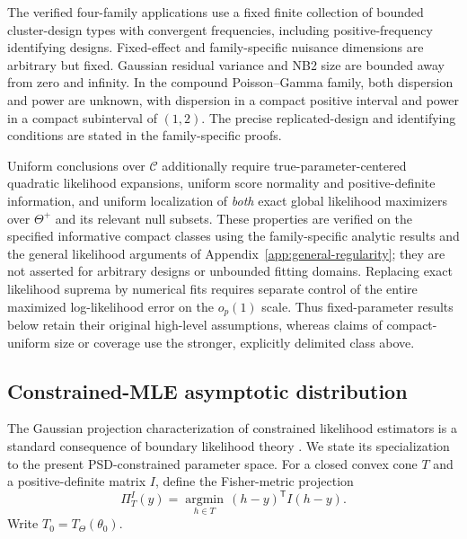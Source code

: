 The verified four-family applications use a fixed finite collection of
bounded cluster-design types with convergent frequencies, including
positive-frequency identifying designs. Fixed-effect and family-specific
nuisance dimensions are arbitrary but fixed. Gaussian residual variance
and NB2 size are bounded away from zero and infinity. In the compound
Poisson--Gamma family, both dispersion and power are unknown, with
dispersion in a compact positive interval and power in a compact
subinterval of $(1,2)$. The precise replicated-design and identifying
conditions are stated in the family-specific proofs.

Uniform conclusions over $\mathcal C$ additionally require
true-parameter-centered quadratic likelihood expansions, uniform score
normality and positive-definite information, and uniform localization of
\emph{both} exact global likelihood maximizers over $\Theta^+$ and its
relevant null subsets. These properties are verified on the specified
informative compact classes using the family-specific analytic results
and the general likelihood arguments of Appendix~\ref{app:general-regularity};
they are not asserted for arbitrary designs or unbounded fitting
domains. Replacing exact likelihood suprema by numerical fits requires
separate control of the entire maximized log-likelihood error on the
$o_p(1)$ scale. Thus fixed-parameter results below retain their original
high-level assumptions, whereas claims of compact-uniform size or
coverage use the stronger, explicitly delimited class above.

\subsection{Constrained-MLE asymptotic distribution}
\label{subsec:constrained_mle_limit}

The Gaussian projection characterization of
constrained likelihood estimators is a standard
consequence of boundary likelihood theory
\citep{self1987asymptotic,shapiro1985}.
We state its specialization to the present
PSD-constrained parameter space.
For a closed convex cone $T$ and a
positive-definite matrix $I$, define the
Fisher-metric projection
\begin{equation}
\Pi_T^I(y)
=
\underset{h\in T}{\operatorname{argmin}}
\,(h-y)^{\mathsf T}I(h-y).
\label{eq:sec4-metric-projection}
\end{equation}
Write $T_0=T_\Theta(\theta_0)$.



